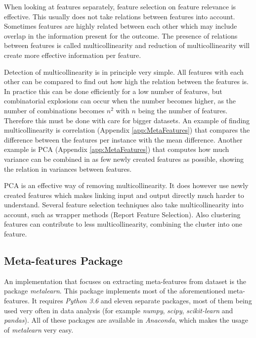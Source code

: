 \documentclass[10pt,a4paper]{article}
\begin{document}
	When looking at features separately, feature selection on feature relevance is effective. This usually does not take relations between features into account. Sometimes features are highly related between each other which may include overlap in the information present for the outcome. The presence of relations between features is called multicollinearity and reduction of multicollinearity will create more effective information per feature.
	
	Detection of multicollinearity is in principle very simple. All features with each other can be compared to find out how high the relation between the features is. In practice this can be done efficiently for a low number of features, but combinatorial explosions can occur when the number becomes higher, as the number of combinations becomes $n^2$ with $n$ being the number of features. Therefore this must be done with care for bigger datasets. An example of finding multicollinearity is correlation (Appendix \ref{app:MetaFeatures}) that compares the difference between the features per instance with the mean difference. Another example is PCA (Appendix \ref{app:MetaFeatures}) that computes how much variance can be combined in as few newly created features as possible, showing the relation in variances between features.
	
	PCA is an effective way of removing multicollinearity. It does however use newly created features which makes linking input and output directly much harder to understand. Several feature selection techniques also take multicollinearity into account, such as wrapper methods (Report Feature Selection). Also clustering features can contribute to less multicollinearity, combining the cluster into one feature\cite{rokach2005clustering}.
	
	\subsection{Meta-features Package}
	\label{subsec:MetaFeatures}
	
	An implementation that focuses on extracting meta-features from dataset is the package \textit{metalearn}. This package implements most of the aforementioned meta-features. It requires \textit{Python 3.6} and eleven separate packages, most of them being used very often in data analysis (for example \textit{numpy}, \textit{scipy}, \textit{scikit-learn} and \textit{pandas}). All of these packages are available in \textit{Anaconda}, which makes the usage of \textit{metalearn} very easy.
	
\end{document}
